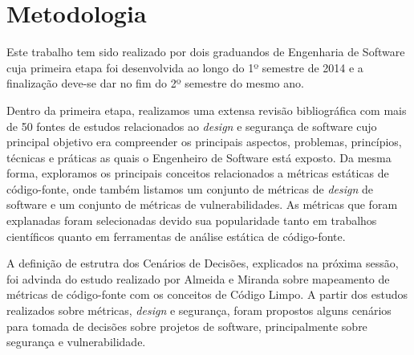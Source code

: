 \section{Metodologia}
\label{sec:methodology}

Este trabalho tem sido realizado por dois graduandos de Engenharia de Software cuja primeira etapa foi desenvolvida ao longo do 1º semestre de 2014 e a finalização deve-se dar no fim do 2º semestre do mesmo ano.
%

Dentro da primeira etapa, realizamos uma extensa revisão bibliográfica com mais de 50 fontes de estudos relacionados ao \emph{design} e segurança de software cujo principal objetivo era compreender os principais aspectos, problemas, princípios, técnicas e práticas as quais o Engenheiro de Software está exposto. Da mesma forma, exploramos os principais conceitos relacionados a métricas estáticas de código-fonte, onde também listamos um conjunto de métricas de \emph{design} de software e um conjunto de métricas de vulnerabilidades. As métricas que foram explanadas foram selecionadas devido sua popularidade tanto em trabalhos científicos quanto em ferramentas de análise estática de código-fonte.

A definição de estrutra dos Cenários de Decisões, explicados na próxima sessão, foi advinda do estudo realizado por Almeida e Miranda \cite{almeida2010} sobre mapeamento de métricas de código-fonte com os conceitos de Código Limpo. A partir dos estudos realizados sobre métricas, \emph{design} e segurança, foram propostos alguns cenários para tomada de decisões sobre projetos de software, principalmente sobre segurança e vulnerabilidade.